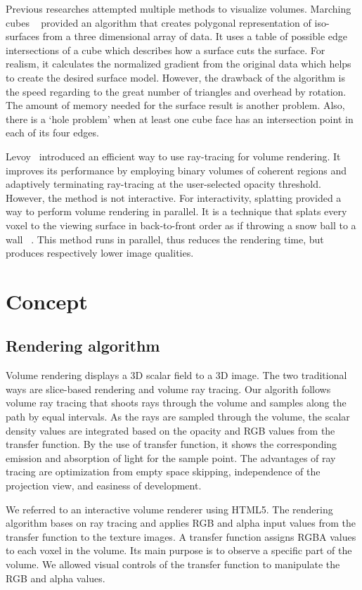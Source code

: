 \documentclass{acm_proc_article-sp}
\begin{document}
Previous researches attempted multiple methods to visualize volumes. Marching cubes ~\cite{lorensen:1987} provided an algorithm that creates polygonal representation of iso-surfaces from a three dimensional array of data. It uses a table of possible edge intersections of a cube which describes how a surface cuts the surface. For realism, it calculates the normalized gradient from the original data which helps to create the desired surface model. However, the drawback of the algorithm is the speed regarding to the great number of triangles and overhead by rotation. The amount of memory needed for the surface result is another problem. Also, there is a ‘hole problem’ when at least one cube face has an intersection point in each of its four edges.

Levoy~\cite{levoy:1990} introduced an efficient way to use ray-tracing for volume rendering. It improves its performance by employing binary volumes of coherent regions and adaptively terminating ray-tracing at the user-selected opacity threshold. However, the method is not interactive.
For interactivity, splatting provided a way to perform volume rendering in parallel. It is a technique that splats every voxel to the viewing surface in back-to-front order as if throwing a snow ball to a wall ~\cite{westover:1991}. This method runs in parallel, thus reduces the rendering time, but produces respectively lower image qualities. 


\section{Concept}
\subsection{Rendering algorithm}

Volume rendering displays a 3D scalar field to a 3D image. The two traditional ways are slice-based rendering and volume ray tracing. Our algorith follows volume ray tracing that shoots rays through the volume and samples along the path by equal intervals. As the rays are sampled through the volume, the scalar density values are integrated based on the opacity and RGB values from the transfer function. By the use of transfer function, it shows the corresponding emission and absorption of light for the sample point. The advantages of ray tracing are optimization from empty space skipping, independence of the projection view, and easiness of development.

We referred to an interactive volume renderer using HTML5. The rendering algorithm bases on ray tracing and applies RGB and alpha input values from the transfer function to the texture images. A transfer function assigns RGBA values to each voxel in the volume. Its main purpose is to observe a specific part of the volume. We allowed visual controls of the transfer function to manipulate the RGB and alpha values. 
\end{document}
